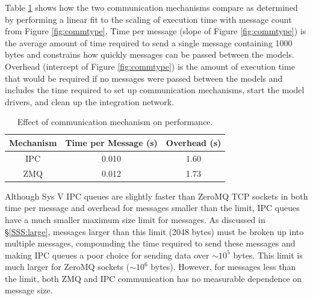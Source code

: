 \documentclass[journal]{IEEEtran}
\begin{document}
Table \ref{tab:commtype} shows how the two communication mechanisms compare as determined by performing a linear fit to the scaling of execution time with message count from Figure \ref{fig:commtype}. Time per message (slope of Figure \ref{fig:commtype}) is the average amount of time required to send a single message containing 1000 bytes and constrains how quickly messages can be passed between the models. Overhead (intercept of Figure \ref{fig:commtype}) is the amount of execution time that would be required if no messages were passed between the models and includes the time required to set up communication mechanisms, start the model drivers, and clean up the integration network.
%
\begin{table}[htbp]
\begin{center}
\begin{tabular}{|c|c|c|}
\hline
Mechanism	& Time per Message (s) 	& Overhead (s) 	\\\hline
IPC			& 0.010				& 1.60			\\
ZMQ 		& 0.012				& 1.73			\\\hline
\end{tabular}
\end{center}
\caption{Effect of communication mechanism on performance.}
\label{tab:commtype}
\end{table}%
%
Although Sys V IPC queues are slightly faster than ZeroMQ TCP sockets in both time per message and overhead for messages smaller than the limit, IPC queues have a much smaller maximum size limit for messages. As discussed in \S\ref{SSS:large}, messages larger than this limit (2048 bytes) must be broken up into multiple messages, compounding the time required to send these messages and making IPC queues a poor choice for sending data over $\sim10^5$ bytes. This limit is much larger for ZeroMQ sockets ($\sim10^6$ bytes). However, for messages less than the limit, both ZMQ and IPC communication has no measurable dependence on message size.

\end{document}
